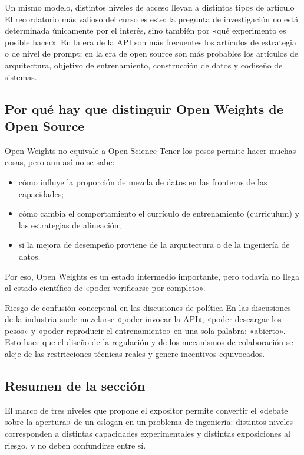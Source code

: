\documentclass[a4paper]{article}
\begin{document}
\begin{importantbox}{Un mismo modelo, distintos niveles de acceso llevan a distintos tipos de artículo}
El recordatorio más valioso del curso es este: la pregunta de investigación no está determinada únicamente por el interés, sino también por «qué experimento es posible hacer».
En la era de la API son más frecuentes los artículos de estrategia o de nivel de prompt; en la era de open source son más probables los artículos de arquitectura, objetivo de entrenamiento, construcción de datos y codiseño de sistemas.
\end{importantbox}

\subsection{Por qué hay que distinguir Open Weights de Open Source}
\begin{knowledgebox}{Open Weights no equivale a Open Science}
Tener los pesos permite hacer muchas cosas, pero aun así no se sabe:
\begin{itemize}
    \item cómo influye la proporción de mezcla de datos en las fronteras de las capacidades;
    \item cómo cambia el comportamiento el currículo de entrenamiento (curriculum) y las estrategias de alineación;
    \item si la mejora de desempeño proviene de la arquitectura o de la ingeniería de datos.
\end{itemize}
Por eso, Open Weights es un estado intermedio importante, pero todavía no llega al estado científico de «poder verificarse por completo».
\end{knowledgebox}

\begin{warningbox}{Riesgo de confusión conceptual en las discusiones de política}
En las discusiones de la industria suele mezclarse «poder invocar la API», «poder descargar los pesos» y «poder reproducir el entrenamiento» en una sola palabra: «abierto». Esto hace que el diseño de la regulación y de los mecanismos de colaboración se aleje de las restricciones técnicas reales y genere incentivos equivocados.
\end{warningbox}

\subsection{Resumen de la sección}
El marco de tres niveles que propone el expositor permite convertir el «debate sobre la apertura» de un eslogan en un problema de ingeniería: distintos niveles corresponden a distintas capacidades experimentales y distintas exposiciones al riesgo, y no deben confundirse entre sí.
\end{document}
